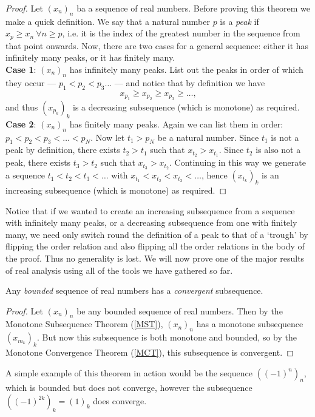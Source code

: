 \documentclass[../real_analysis.tex]{subfiles}
\begin{document}
        \begin{proof}
            Let $(x_n)_n$ ba a sequence of real numbers. Before proving this theorem we make a quick definition. We say that a natural number $p$ is a \textit{peak} if $x_p\geq x_n\ \forall n\geq p$, i.e. it is the index of the greatest number in the sequence from that point onwards. Now, there are two cases for a general sequence: either it has infinitely many peaks, or it has finitely many.\\
            \textbf{Case 1}: $(x_n)_n$ has infinitely many peaks. List out the peaks in order of which they occur --- $p_1<p_2<p_3\dots$ --- and notice that by definition we have
            \begin{equation}
                x_{p_1}\geq x_{p_2}\geq x_{p_3}\geq\dots,
            \end{equation}
            and thus $(x_{p_k})_k$ is a decreasing subsequence (which is monotone) as required.\\
            \textbf{Case 2}: $(x_n)_n$ has finitely many peaks. Again we can list them in order: $p_1<p_2<p_3<\dots<p_N$. Now let $t_1>p_N$ be a natural number. Since $t_1$ is not a peak by definition, there exists $t_2>t_1$ such that $x_{t_2}>x_{t_1}$. Since $t_2$ is also not a peak, there exists $t_3>t_2$ such that $x_{t_3}>x_{t_2}$. Continuing in this way we generate a sequence $t_1<t_2<t_3<\dots$ with $x_{t_1}<x_{t_2}<x_{t_3}<\dots$, hence $(x_{t_k})_k$ is an increasing subsequence (which is monotone) as required.
        \end{proof}
        Notice that if we wanted to create an increasing subsequence from a sequence with infinitely many peaks, or a decreasing subsequence from one with finitely many, we need only switch round the definition of a peak to that of a `trough' by flipping the order relation and also flipping all the order relations in the body of the proof. Thus no generality is lost. We will now prove one of the major results of real analysis using all of the tools we have gathered so far.
        \begin{theorem}\label{BWT}
            Any \textit{bounded} sequence of real numbers has a \textit{convergent} subsequence.
        \end{theorem}
        \begin{proof}
            Let $(x_n)_n$ be any bounded sequence of real numbers. Then by the Monotone Subsequence Theorem (\ref{MST}), $(x_n)_n$ has a monotone subsequence $(x_{m_k})_k$. But now this subsequence is both monotone and bounded, so by the Monotone Convergence Theorem (\ref{MCT}), this subsequence is convergent.
        \end{proof}
        A simple example of this theorem in action would be the sequence $((-1)^n)_n$, which is bounded but does not converge, however the subsequence $((-1)^{2k})_k=(1)_k$ does converge.
\end{document}
